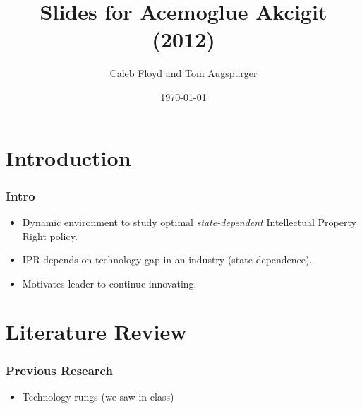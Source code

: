 \documentclass{beamer}
\title{Slides for Acemoglue Akcigit (2012)}
\author{Caleb Floyd and Tom Augspurger}
\date{\today}
\begin{document}
\frame{\titlepage}




\section{Introduction}
\label{sec:introduction}

\begin{frame}[t]\frametitle{Intro}
  \begin{itemize}
    \item<+-> Dynamic environment to study optimal \emph{state-dependent} Intellectual Property Right policy.
    \item<+-> IPR depends on technology gap in an industry (state-dependence).
    \item<+-> Motivates leader to continue innovating.
  \end{itemize}
\end{frame}

\section{Literature Review}
\label{sec:literature_review}
\begin{frame}[t]\frametitle{Previous Research} 
  \begin{itemize}
    \item<+-> Technology rungs (we saw in class)
  \end{itemize}  
\end{frame}
\end{document}
